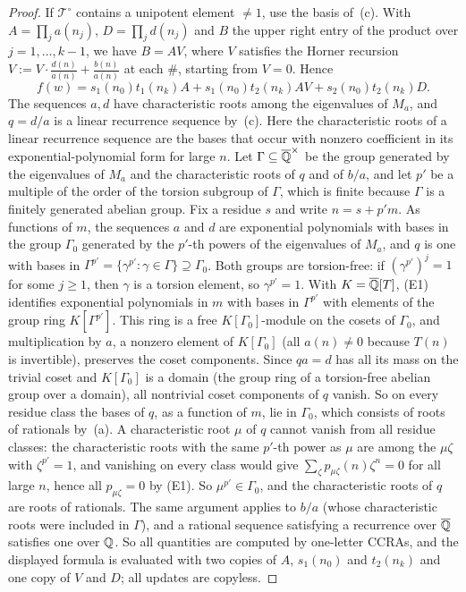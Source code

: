 \begin{proof}
If $\mathcal T^\circ$ contains a unipotent element $\ne1$, use the basis of~(c). With $A=\prod_ja(n_j)$, $D=\prod_jd(n_j)$ and $B$ the upper right entry of the product over $j=1,\ldots,k-1$, we have $B=AV$, where $V$ satisfies the Horner recursion $V:=V\cdot\frac{d(n)}{a(n)}+\frac{b(n)}{a(n)}$ at each $\#$, starting from $V=0$. Hence
\[
f(w)=s_1(n_0)t_1(n_k)A+s_1(n_0)t_2(n_k)AV+s_2(n_0)t_2(n_k)D .
\]
The sequences $a,d$ have characteristic roots among the eigenvalues of $M_a$, and $q=d/a$ is a linear recurrence sequence by~(c). Here the characteristic roots of a linear recurrence sequence are the bases that occur with nonzero coefficient in its exponential-polynomial form for large $n$. Let $\Gamma\subseteq\overline{\mathbb{Q}}^\times$ be the group generated by the eigenvalues of $M_a$ and the characteristic roots of $q$ and of $b/a$, and let $p'$ be a multiple of the order of the torsion subgroup of $\Gamma$, which is finite because $\Gamma$ is a finitely generated abelian group. Fix a residue $s$ and write $n=s+p'm$. As functions of $m$, the sequences $a$ and $d$ are exponential polynomials with bases in the group $\Gamma_0$ generated by the $p'$-th powers of the eigenvalues of $M_a$, and $q$ is one with bases in $\Gamma^{p'}=\{\gamma^{p'}:\gamma\in\Gamma\}\supseteq\Gamma_0$. Both groups are torsion-free: if $(\gamma^{p'})^j=1$ for some $j\ge1$, then $\gamma$ is a torsion element, so $\gamma^{p'}=1$. With $K=\overline{\mathbb{Q}}[T]$, (E1) identifies exponential polynomials in $m$ with bases in $\Gamma^{p'}$ with elements of the group ring $K[\Gamma^{p'}]$. This ring is a free $K[\Gamma_0]$-module on the cosets of $\Gamma_0$, and multiplication by $a$, a nonzero element of $K[\Gamma_0]$ (all $a(n)\ne0$ because $T(n)$ is invertible), preserves the coset components. Since $qa=d$ has all its mass on the trivial coset and $K[\Gamma_0]$ is a domain (the group ring of a torsion-free abelian group over a domain), all nontrivial coset components of $q$ vanish. So on every residue class the bases of $q$, as a function of $m$, lie in $\Gamma_0$, which consists of roots of rationals by~(a). A characteristic root $\mu$ of $q$ cannot vanish from all residue classes: the characteristic roots with the same $p'$-th power as $\mu$ are among the $\mu\zeta$ with $\zeta^{p'}=1$, and vanishing on every class would give $\sum_\zeta p_{\mu\zeta}(n)\zeta^n=0$ for all large $n$, hence all $p_{\mu\zeta}=0$ by (E1). So $\mu^{p'}\in\Gamma_0$, and the characteristic roots of $q$ are roots of rationals. The same argument applies to $b/a$ (whose characteristic roots were included in $\Gamma$), and a rational sequence satisfying a recurrence over $\overline{\mathbb{Q}}$ satisfies one over $\mathbb{Q}$. So all quantities are computed by one-letter CCRAs, and the displayed formula is evaluated with two copies of $A$, $s_1(n_0)$ and $t_2(n_k)$ and one copy of $V$ and $D$; all updates are copyless.


\end{proof}
